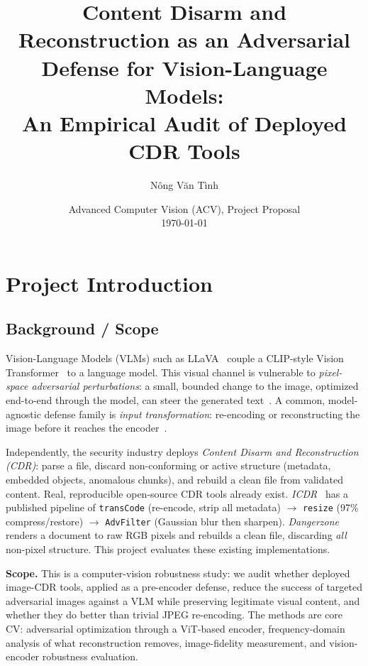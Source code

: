 \documentclass[11pt]{article}
\title{\vspace{-2.2em}\textbf{Content Disarm and Reconstruction as an
Adversarial Defense for Vision-Language Models:\\
An Empirical Audit of Deployed CDR Tools}}
\author{Nông Văn Tình}
\date{Advanced Computer Vision (ACV), Project Proposal \\ \today}
\begin{document}
\maketitle
\vspace{-1.2em}

\section{Project Introduction}

\subsection{Background / Scope}
Vision-Language Models (VLMs) such as LLaVA~\cite{liu2023llava} couple a
CLIP-style Vision Transformer~\cite{radford2021clip} to a language model. This
visual channel is vulnerable to \emph{pixel-space adversarial perturbations}:
a small, bounded change to the image, optimized end-to-end through the model,
can steer the generated text~\cite{qi2024visualaaai,univperturb2024}. A common,
model-agnostic defense family is \emph{input transformation}: re-encoding or
reconstructing the image before it reaches the encoder~\cite{guo2018countering}.

Independently, the security industry deploys \emph{Content Disarm and
Reconstruction (CDR)}: parse a file, discard non-conforming or active structure
(metadata, embedded objects, anomalous chunks), and rebuild a clean file from
validated content. Real, reproducible open-source CDR tools already exist.
\emph{ICDR}~\cite{icdr,openimagecdr} has a published pipeline of
\texttt{transCode} (re-encode, strip all metadata) $\rightarrow$ \texttt{resize}
(97\% compress/restore) $\rightarrow$ \texttt{AdvFilter} (Gaussian blur then
sharpen). \emph{Dangerzone}~\cite{dangerzone} renders a document to
raw RGB pixels and rebuilds a clean file, discarding \emph{all} non-pixel
structure. This project evaluates these existing implementations.

\textbf{Scope.} This is a computer-vision robustness study: we audit whether
deployed image-CDR tools, applied as a pre-encoder defense, reduce the success of
targeted adversarial images against a VLM while preserving legitimate visual
content, and whether they do better than trivial JPEG re-encoding. The methods
are core CV: adversarial optimization through a ViT-based encoder, frequency-domain
analysis of what reconstruction removes, image-fidelity measurement, and
vision-encoder robustness evaluation.
\end{document}
